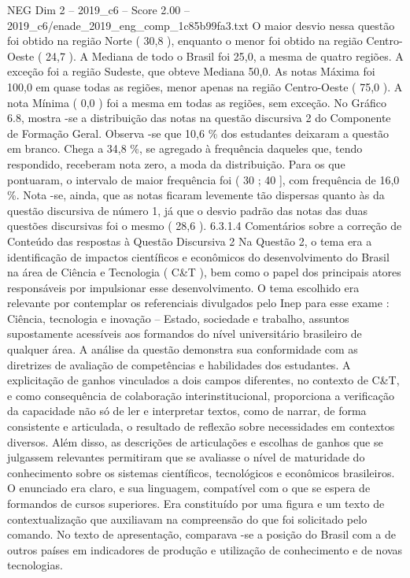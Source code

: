 \begin{textsample}{NEG Dim 2 – 2019\_c6 – Score 2.00 – 2019\_c6/enade\_2019\_eng\_comp\_1c85b99fa3.txt}
O maior desvio nessa questão foi obtido na região Norte ( 30,8 ), enquanto o menor foi obtido na região Centro-Oeste ( 24,7 ).
A Mediana de todo o Brasil foi 25,0, a mesma de quatro regiões.
A exceção foi a região Sudeste, que obteve Mediana 50,0.
As notas Máxima foi 100,0 em quase todas as regiões, menor apenas na região Centro-Oeste ( 75,0 ).
A nota Mínima ( 0,0 ) foi a mesma em todas as regiões, sem exceção.
No Gráfico 6.8, mostra -se a distribuição das notas na questão discursiva 2 do Componente de Formação Geral.
Observa -se que 10,6 \% dos estudantes deixaram a questão em branco.
Chega a 34,8 \%, se agregado à frequência daqueles que, tendo respondido, receberam nota zero, a moda da distribuição.
Para os que pontuaram, o intervalo de maior frequência foi ( 30 ; 40 ], com frequência de 16,0 \%.
Nota -se, ainda, que as notas ficaram levemente tão dispersas quanto às da questão discursiva de número 1, já que o desvio padrão das notas das duas questões discursivas foi o mesmo ( 28,6 ). 6.3.1.4 Comentários sobre a correção de Conteúdo das respostas à Questão Discursiva 2 Na Questão 2, o tema era a identificação de impactos científicos e econômicos do desenvolvimento do Brasil na área de Ciência e Tecnologia ( C\&T ), bem como o papel dos principais atores responsáveis por impulsionar esse desenvolvimento.
O tema escolhido era relevante por contemplar os referenciais divulgados pelo Inep para esse exame : Ciência, tecnologia e inovação – Estado, sociedade e trabalho, assuntos supostamente acessíveis aos formandos do nível universitário brasileiro de qualquer área.
A análise da questão demonstra sua conformidade com as diretrizes de avaliação de competências e habilidades dos estudantes.
A explicitação de ganhos vinculados a dois campos diferentes, no contexto de C\&T, e como consequência de colaboração interinstitucional, proporciona a verificação da capacidade não só de ler e interpretar textos, como de narrar, de forma consistente e articulada, o resultado de reflexão sobre necessidades em contextos diversos.
Além disso, as descrições de articulações e escolhas de ganhos que se julgassem relevantes permitiram que se avaliasse o nível de maturidade do conhecimento sobre os sistemas científicos, tecnológicos e econômicos brasileiros.
O enunciado era claro, e sua linguagem, compatível com o que se espera de formandos de cursos superiores.
Era constituído por uma figura e um texto de contextualização que auxiliavam na compreensão do que foi solicitado pelo comando.
No texto de apresentação, comparava -se a posição do Brasil com a de outros países em indicadores de produção e utilização de conhecimento e de novas tecnologias.

\end{textsample}
